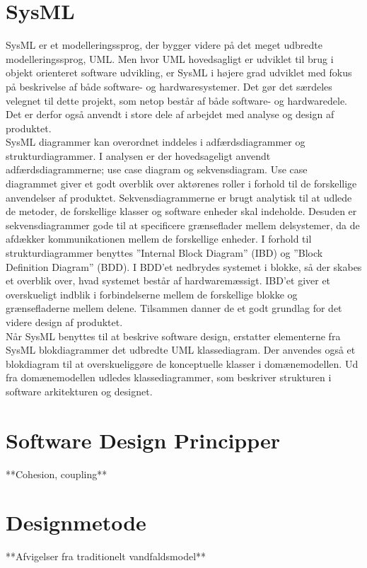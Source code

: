 \section{SysML}
SysML er et modelleringssprog, der bygger videre på det meget udbredte modelleringssprog, UML. Men hvor UML hovedsagligt er udviklet til brug i objekt orienteret software udvikling, er SysML i højere grad udviklet med fokus på beskrivelse af både software- og hardwaresystemer. Det gør det særdeles velegnet til dette projekt, som netop består af både software- og hardwaredele. Det er derfor også anvendt i store dele af arbejdet med analyse og design af produktet. \\
SysML diagrammer kan overordnet inddeles i adfærdsdiagrammer og strukturdiagrammer. I analysen er der hovedsageligt anvendt adfærdsdiagrammerne; use case diagram og sekvensdiagram. Use case diagrammet giver et godt overblik over aktørenes roller i forhold til de forskellige anvendelser af produktet. Sekvensdiagrammerne er brugt analytisk til at udlede de metoder, de forskellige klasser og software enheder skal indeholde. Desuden er sekvensdiagrammer gode til at specificere grænseflader mellem delsystemer, da de afdækker kommunikationen mellem de forskellige enheder. I forhold til strukturdiagrammer benyttes ”Internal Block Diagram” (IBD) og ”Block Definition Diagram” (BDD). I BDD’et nedbrydes systemet i blokke, så der skabes et overblik over, hvad systemet består af hardwaremæssigt. IBD’et giver et overskueligt indblik i forbindelserne mellem de forskellige blokke og grænsefladerne mellem delene. Tilsammen danner de et godt grundlag for det videre design af produktet. \\
Når SysML benyttes til at beskrive software design, erstatter elementerne fra SysML blokdiagrammer det udbredte UML klassediagram. Der anvendes også et blokdiagram til at overskueliggøre de konceptuelle klasser i domænemodellen. Ud fra domænemodellen udledes klassediagrammer, som beskriver strukturen i software arkitekturen og designet. 




\section{Software Design Principper}

**Cohesion, coupling**

\section{Designmetode}

**Afvigelser fra traditionelt vandfaldsmodel**